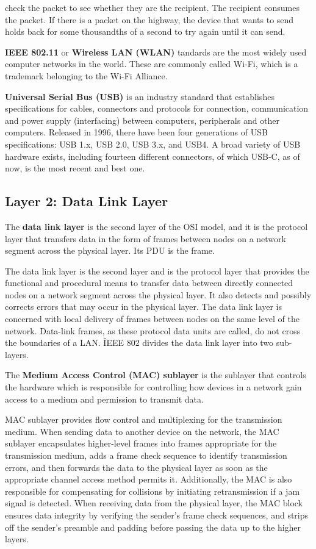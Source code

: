 check the packet to see whether they are the recipient. The recipient consumes the packet. If there is a packet on
the highway, the device that wants to send holds back for some thousandths of a second to try again until it can send.
\item \textbf{IEEE 802.11} or \textbf{Wireless LAN (WLAN)} tandards are the most widely used computer networks in the
world. These are commonly called Wi-Fi, which is a trademark belonging to the Wi-Fi Alliance.
\item \textbf{Universal Serial Bus (USB)} is an industry standard that establishes specifications for cables,
connectors and protocols for connection, communication and power supply (interfacing) between computers, peripherals
and other computers. Released in 1996, there have been four generations of USB specifications: USB 1.x, USB 2.0, USB
3.x, and USB4. A broad variety of USB hardware exists, including fourteen different connectors, of which USB-C, as of
now, is the most recent and best one.
\eit

\subsection{Layer 2: Data Link Layer}

The \textbf{data link layer} is the second layer of the OSI model, and it is the protocol layer that transfers data
in the form of frames between nodes on a network segment across the physical layer. Its PDU is the frame.
\ed

The data link layer is the second layer and is the protocol layer that provides the functional and procedural means
to transfer data between directly connected nodes on a network segment across the physical layer. It also detects and
possibly corrects errors that may occur in the physical layer. The data link layer is concerned with local delivery
of frames between nodes on the same level of the network. Data-link frames, as these protocol data units are called,
do not cross the boundaries of a LAN. \v

IEEE 802 divides the data link layer into two sub-layers.

The \textbf{Medium Access Control (MAC) sublayer} is the sublayer that controls the hardware which is responsible for
controlling how devices in a network gain access to a medium and permission to transmit data.
\ed

MAC sublayer provides flow control and multiplexing for the transmission medium. When sending data to another device
on the network, the MAC sublayer encapsulates higher-level frames into frames appropriate for the transmission
medium, adds a frame check sequence to identify transmission errors, and then forwards the data to the physical layer
as soon as the appropriate channel access method permits it. Additionally, the MAC is also responsible for
compensating for collisions by initiating retransmission if a jam signal is detected. When receiving data from the
physical layer, the MAC block ensures data integrity by verifying the sender's frame check sequences, and strips off
the sender's preamble and padding before passing the data up to the higher layers.


